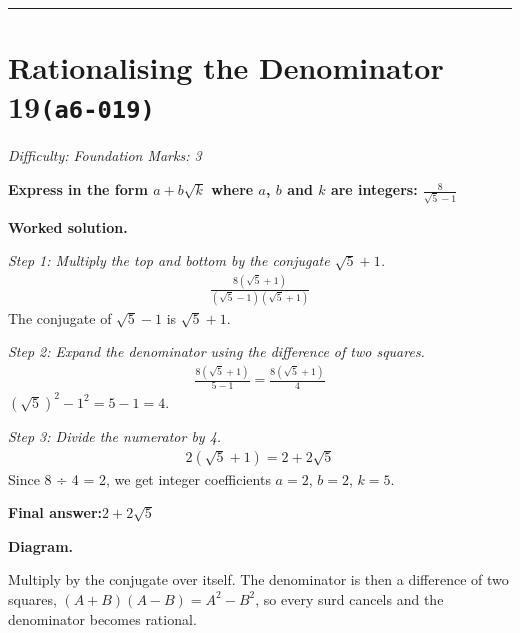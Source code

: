 \documentclass[11pt]{article}
\newcommand{\question}[1]{\par\medskip\noindent\textbf{#1}\par}
\begin{document}
\medskip\hrule

\section*{Rationalising the Denominator 19\quad\small\texttt{(a6-019)}}
\textit{Difficulty: Foundation \quad\textbar\quad Marks: 3}

\question{Express in the form \( a + b\sqrt{k} \) where \( a \), \( b \) and \( k \) are integers: \( \frac{8}{\sqrt{5} - 1} \)}

\textbf{Worked solution.}

\textit{Step 1: Multiply the top and bottom by the conjugate \( \sqrt{5} + 1 \).}
\[\begin{gathered}
\frac{8(\sqrt{5} + 1)}{(\sqrt{5} - 1)(\sqrt{5} + 1)}
\end{gathered}\]
The conjugate of \( \sqrt{5} - 1 \) is \( \sqrt{5} + 1 \).

\textit{Step 2: Expand the denominator using the difference of two squares.}
\[\begin{gathered}
\frac{8(\sqrt{5} + 1)}{5 - 1} = \frac{8(\sqrt{5} + 1)}{4}
\end{gathered}\]
\( (\sqrt{5})^2 - 1^2 = 5 - 1 = 4 \).

\textit{Step 3: Divide the numerator by 4.}
\[\begin{gathered}
2(\sqrt{5} + 1) = 2 + 2\sqrt{5}
\end{gathered}\]
Since 8 ÷ 4 = 2, we get integer coefficients \( a = 2 \), \( b = 2 \), \( k = 5 \).

\begin{answerbox}
\textbf{Final answer:}\quad \(\displaystyle 2 + 2\sqrt{5}\)
\end{answerbox}
\textbf{Diagram.}

\begin{center}
\end{center}
\small Multiply by the conjugate over itself. The denominator is then a difference of two squares, $(A+B)(A-B)=A^{2}-B^{2}$, so every surd cancels and the denominator becomes rational.\normalsize
\end{document}
